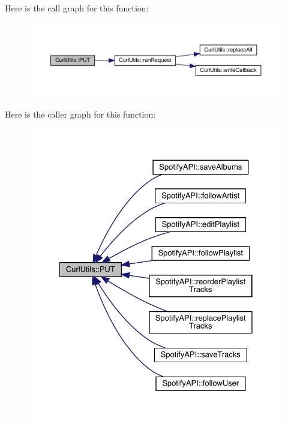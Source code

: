 Here is the call graph for this function\+:
\nopagebreak
\begin{figure}[H]
\begin{center}
\leavevmode
\includegraphics[width=350pt]{class_curl_utils_a3b852e68c1c552950944c512712a3620_cgraph}
\end{center}
\end{figure}
Here is the caller graph for this function\+:
\nopagebreak
\begin{figure}[H]
\begin{center}
\leavevmode
\includegraphics[width=328pt]{class_curl_utils_a3b852e68c1c552950944c512712a3620_icgraph}
\end{center}
\end{figure}
\mbox{\label{class_curl_utils_a86211746c9f0981b56fd143996a10a4a}} 
